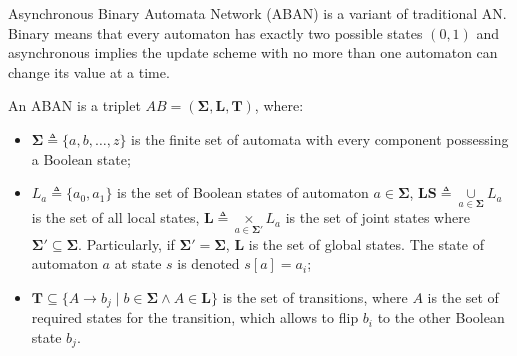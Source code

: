 \documentclass[runningheads]{llncs}
\begin{document}
%

Asynchronous Binary Automata Network (ABAN) is a variant of traditional AN.
Binary means that every automaton has exactly two possible states $(0,1)$ and asynchronous implies the update scheme with no more than one automaton can change its value at a time. 

\begin{definition}[ABAN]
An ABAN is a triplet $AB = (\mathbf{\Sigma},\mathbf{L},\mathbf{T})$, where:
\begin{itemize}
\item $\mathbf{\Sigma}\triangleq\{a,b,\ldots,z\}$ is the finite set of automata with every component possessing a Boolean state;
\item $L_a\triangleq\{a_0,a_1\}$ is the set of Boolean states of automaton $a\in \mathbf{\Sigma}$, $\mathbf{LS}\triangleq \underset{a\in \mathbf{\Sigma}}{\cup} L_a$ is the set of all local states,  $\mathbf{L}\triangleq \underset{a\in \mathbf{\Sigma'}}{\times} L_a$ is the set of joint states where $\mathbf{\Sigma'}\subseteq\mathbf{\Sigma}$. Particularly, if $\mathbf{\Sigma'}=\mathbf{\Sigma}$, $\mathbf{L}$ is the set of global states. 
The state of automaton $a$ at state $s$ is denoted $s[a]=a_i$;
\item $\mathbf{T}\subseteq \{A\to b_j\mid b\in \mathbf{\Sigma} \land A\in \mathbf{L}\}$ is the set of transitions, where $A$ is the set of required states for the transition, which allows to flip $b_i$ to the other Boolean state $b_j$.
\end{itemize}
\end{definition}
\end{document}
